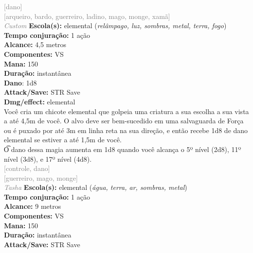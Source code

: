 \documentclass{RPG_Adventure}[2021/10/20]
\begin{document}
{\scriptsize \textcolor{gray}{[dano]\\}}
{\scriptsize \textcolor{gray}{[arqueiro, bardo, guerreiro, ladino, mago, monge, xamã]\\}}
{\tiny \textcolor{gray}{\textit{Custom}}}\jump{}
{\small \t \textbf{Escola(s):} elemental (\textit{relâmpago, luz, sombras, metal, terra, fogo})\\\t \textbf{Tempo conjuração:} 1 ação\\\t \textbf{Alcance:} 4,5 metros\\\t \textbf{Componentes:} VS\\\t \textbf{Mana:} 150\\\t \textbf{Duração:} instantânea\\\t \textbf{Dano}: 1d8\\\t \textbf{Attack/Save:} STR Save\\\t \textbf{Dmg/effect:} elemental\\}
{\normalsize Você cria um chicote elemental que golpeia uma criatura a sua escolha a sua vista a até 4,5m de você. O alvo deve ser bem-sucedido em uma salvaguarda de Força ou é puxado por até 3m em linha reta na sua direção, e então recebe 1d8 de dano elemental se estiver a até 1,5m de você.\\\t O dano dessa magia aumenta em 1d8 quando você alcança o 5º nível (2d8), 11º nível (3d8), e 17º nível (4d8).\\}
{\scriptsize \textcolor{gray}{[controle, dano]\\}}
{\scriptsize \textcolor{gray}{[guerreiro, mago, monge]\\}}
{\tiny \textcolor{gray}{\textit{Tasha}}}\jump{}
{\small \t \textbf{Escola(s):} elemental (\textit{água, terra, ar, sombras, metal})\\\t \textbf{Tempo conjuração:} 1 ação\\\t \textbf{Alcance:} 9 metros\\\t \textbf{Componentes:} VS\\\t \textbf{Mana:} 150\\\t \textbf{Duração:} instantânea\\\t \textbf{Attack/Save:} STR Save\\}
\end{document}
